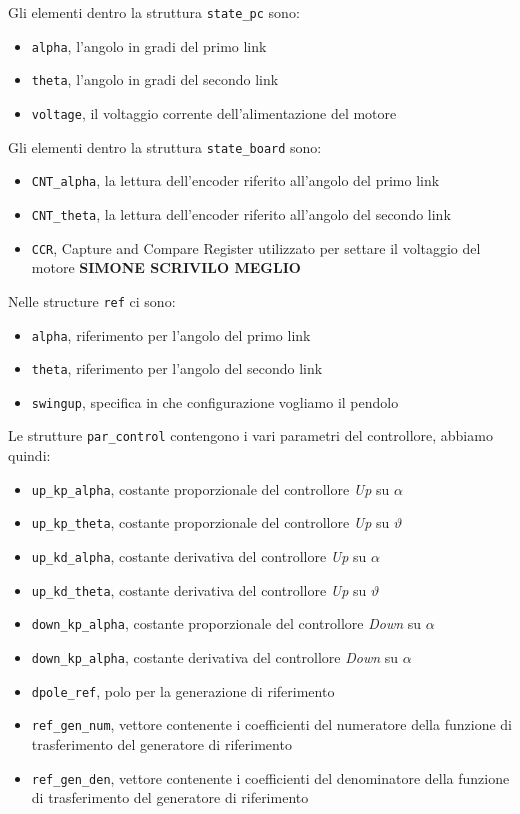 Gli elementi dentro la struttura \texttt{state\_pc} sono:
\begin{itemize}
	\item \texttt{alpha}, l'angolo in gradi del primo link
	\item \texttt{theta}, l'angolo in gradi del secondo link
	\item \texttt{voltage}, il voltaggio corrente dell'alimentazione del motore
\end{itemize}
Gli elementi dentro la struttura \texttt{state\_board} sono:
\begin{itemize}
	\item \texttt{CNT\_alpha}, la lettura dell'encoder riferito all'angolo del primo link
	\item \texttt{CNT\_theta}, la lettura dell'encoder riferito all'angolo del secondo link
	\item \texttt{CCR}, Capture and Compare Register utilizzato per settare il voltaggio del motore \textbf{SIMONE SCRIVILO MEGLIO}
\end{itemize}
Nelle structure \texttt{ref} ci sono:
\begin{itemize}
	\item \texttt{alpha}, riferimento per l'angolo del primo link
	\item \texttt{theta}, riferimento per l'angolo del secondo link
	\item \texttt{swingup}, specifica in che configurazione vogliamo il pendolo
\end{itemize}
Le strutture \texttt{par\_control} contengono i vari parametri del controllore, abbiamo quindi:
\begin{itemize}
	\item \texttt{up\_kp\_alpha}, costante proporzionale del controllore \textit{Up} su $\alpha$
	\item \texttt{up\_kp\_theta}, costante proporzionale del controllore \textit{Up} su $\vartheta$
	\item \texttt{up\_kd\_alpha}, costante derivativa del controllore \textit{Up} su $\alpha$
	\item \texttt{up\_kd\_theta}, costante derivativa del controllore \textit{Up} su $\vartheta$
	\item \texttt{down\_kp\_alpha}, costante proporzionale del controllore \textit{Down} su $\alpha$
	\item \texttt{down\_kp\_alpha}, costante derivativa del controllore \textit{Down} su $\alpha$
	\item \texttt{dpole\_ref}, polo per la generazione di riferimento
	\item \texttt{ref\_gen\_num}, vettore contenente i coefficienti del numeratore della funzione di trasferimento del generatore di riferimento
	\item \texttt{ref\_gen\_den}, vettore contenente i coefficienti del denominatore della funzione di trasferimento del generatore di riferimento
\end{itemize}
